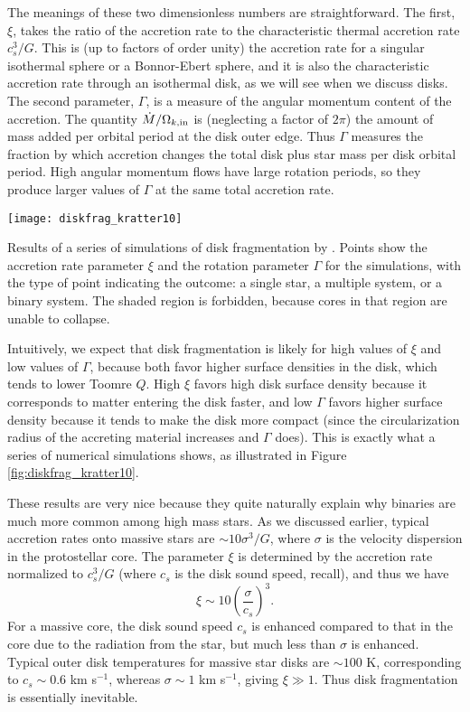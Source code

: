 The meanings of these two dimensionless numbers are straightforward. The first, $\xi$, takes the ratio of the accretion rate to the characteristic thermal accretion rate $c_s^3/G$. This is (up to factors of order unity) the accretion rate for a singular isothermal sphere or a Bonnor-Ebert sphere, and it is also the characteristic accretion rate through an isothermal disk, as we will see when we discuss disks. The second parameter, $\Gamma$, is a measure of the angular momentum content of the accretion. The quantity $\dot{M}/\Omega_{k,\rm in}$ is (neglecting a factor of $2\pi$) the amount of mass added per orbital period at the disk outer edge. Thus $\Gamma$ measures the fraction by which accretion changes the total disk plus star mass per disk orbital period. High angular momentum flows have large rotation periods, so they produce larger values of $\Gamma$ at the same total accretion rate.
\begin{marginfigure}
\texttt{[image: diskfrag\_kratter10]}
\caption[Parameter study of disk fragmentation]{
\label{fig:diskfrag_kratter10}
Results of a series of simulations of disk fragmentation by \citet{kratter10a}. Points show the accretion rate parameter $\xi$ and the rotation parameter $\Gamma$ for the simulations, with the type of point indicating the outcome: a single star, a multiple system, or a binary system. The shaded region is forbidden, because cores in that region are unable to collapse.
}
\end{marginfigure}

Intuitively, we expect that disk fragmentation is likely for high values of $\xi$ and low values of $\Gamma$, because both favor higher surface densities in the disk, which tends to lower Toomre $Q$. High $\xi$ favors high disk surface density because it corresponds to matter entering the disk faster, and low $\Gamma$ favors higher surface density because it tends to make the disk more compact (since the circularization radius of the accreting material increases and $\Gamma$ does). This is exactly what a series of numerical simulations shows, as illustrated in Figure \ref{fig:diskfrag_kratter10}.

These results are very nice because they quite naturally explain why binaries are much more common among high mass stars. As we discussed earlier, typical accretion rates onto massive stars are $\sim 10 \sigma^3/G$, where $\sigma$ is the velocity dispersion in the protostellar core. The parameter $\xi$ is determined by the accretion rate normalized to $c_s^3/G$ (where $c_s$ is the disk sound speed, recall), and thus we have
\begin{equation}
\xi \sim 10\left(\frac{\sigma}{c_s}\right)^3.
\end{equation}
For a massive core, the disk sound speed $c_s$ is enhanced compared to that in the core due to the radiation from the star, but much less than $\sigma$ is enhanced. Typical outer disk temperatures for massive star disks are $\sim 100$ K, corresponding to $c_s \sim 0.6$ km s$^{-1}$, whereas $\sigma \sim 1$ km s$^{-1}$, giving $\xi \gg 1$. Thus disk fragmentation is essentially inevitable.

